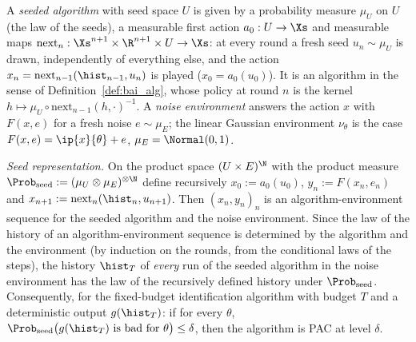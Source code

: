 \begin{lemma}\label{lem:seeded}
\leanok
{}
A \emph{seeded algorithm} with seed space $U$ is given by a probability measure $\mu_U$ on
$U$ (the law of the seeds), a measurable first action $a_0 : U \to \Xs$ and measurable
maps $\mathrm{next}_n : \Xs^{n+1} \times \R^{n+1} \times U \to \Xs$: at every round a fresh seed
$u_n \sim \mu_U$ is drawn, independently of everything else, and the action
$x_n = \mathrm{next}_{n-1}(\hist_{n-1}, u_n)$ is played ($x_0 = a_0(u_0)$). It is an
algorithm in the sense of Definition~\ref{def:bai_alg}, whose policy at round $n$ is the
kernel $h \mapsto \mu_U \circ \mathrm{next}_{n-1}(h, \cdot)^{-1}$. A \emph{noise environment}
answers the action $x$ with $F(x, e)$ for a fresh noise $e \sim \mu_E$; the linear Gaussian
environment $\nu_\theta$ is the case $F(x, e) = \ip{x}{\theta} + e$, $\mu_E = \Normal(0,1)$.

\emph{Seed representation.} On the product space $(U \times E)^{\N}$ with the product
measure $\Prob_{\mathrm{seed}} := (\mu_U \otimes \mu_E)^{\otimes\N}$ define recursively
$x_0 := a_0(u_0)$, $y_n := F(x_n, e_n)$ and $x_{n+1} := \mathrm{next}_n(\hist_n, u_{n+1})$.
Then $(x_n, y_n)_n$ is an algorithm-environment sequence for the seeded algorithm and the
noise environment. Since the law of the history of an algorithm-environment sequence is
determined by the algorithm and the environment (by induction on the rounds, from the
conditional laws of the steps), the history $\hist_T$ of \emph{every} run of the seeded
algorithm in the noise environment has the law of the recursively defined history under
$\Prob_{\mathrm{seed}}$. Consequently, for the fixed-budget identification algorithm with
budget $T$ and a deterministic output $g(\hist_T)$: if for every $\theta$,
$\Prob_{\mathrm{seed}}\big(g(\hist_T) \text{ is bad for } \theta\big) \le \delta$, then
the algorithm is PAC at level $\delta$.
\end{lemma}


